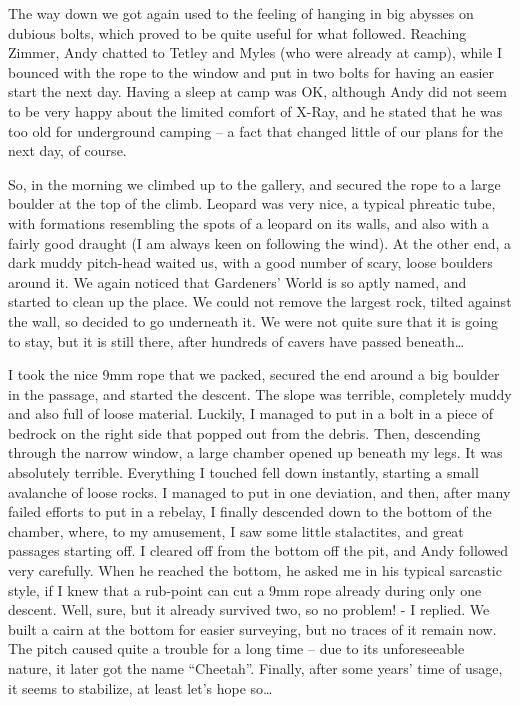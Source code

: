 The way down we got again used to the feeling of hanging in big abysses
on dubious bolts, which proved to be quite useful for what followed.
Reaching Zimmer, Andy chatted to Tetley and Myles (who were already at
camp), while I bounced with the rope to the window and put in two bolts
for having an easier start the next day. Having a sleep at camp was OK,
although Andy did not seem to be very happy about the limited comfort of
X-Ray, and he stated that he was too old for underground camping -- a
fact that changed little of our plans for the next day, of course.

So, in the morning we climbed up to the gallery, and secured the rope to
a large boulder at the top of the climb. Leopard was very nice, a
typical phreatic tube, with formations resembling the spots of a leopard
on its walls, and also with a fairly good draught (I am always keen on
following the wind). At the other end, a dark muddy pitch-head waited
us, with a good number of scary, loose boulders around it. We again
noticed that Gardeners' World is so aptly named, and started to clean up
the place. We could not remove the largest rock, tilted against the
wall, so decided to go underneath it. We were not quite sure that it is
going to stay, but it is still there, after hundreds of cavers have
passed beneath\ldots{}

I took the nice 9mm rope that we packed, secured the end around a big
boulder in the passage, and started the descent. The slope was terrible,
completely muddy and also full of loose material. Luckily, I managed to
put in a bolt in a piece of bedrock on the right side that popped out
from the debris. Then, descending through the narrow window, a large
chamber opened up beneath my legs. It was absolutely terrible.
Everything I touched fell down instantly, starting a small avalanche of
loose rocks. I managed to put in one deviation, and then, after many
failed efforts to put in a rebelay, I finally descended down to the
bottom of the chamber, where, to my amusement, I saw some little
stalactites, and great passages starting off. I cleared off from the
bottom off the pit, and Andy followed very carefully. When he reached
the bottom, he asked me in his typical sarcastic style, if I knew that a
rub-point can cut a 9mm rope already during only one descent. Well,
sure, but it already survived two, so no problem! - I replied. We built
a cairn at the bottom for easier surveying, but no traces of it remain
now. The pitch caused quite a trouble for a long time -- due to its
unforeseeable nature, it later got the name ``Cheetah''. Finally, after
some years' time of usage, it seems to stabilize, at least let's hope
so\ldots{}

